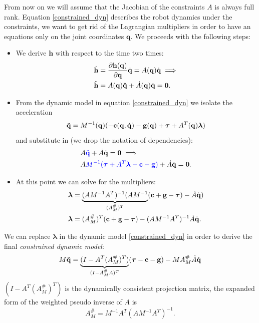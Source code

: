 \documentclass[10pt, a4paper]{report}
\newcommand{\q}{{\mathbf q}}
\begin{document}
From now on we will assume that the Jacobian of the constraints $A$ is always full rank. Equation \eqref{constrained_dyn} describes the robot dynamics under the constraints, we want to get rid of the Lagrangian multipliers in order to have an equations only on the joint coordinates $\q$. We proceeds with the following steps:\begin{itemize}
    \item We derive $\mathbf h$ with respect to the time two times:\begin{align}
       & \dot{\mathbf h}=\frac{\partial \mathbf h(\q)}{\partial \q}\dq=A(\q)\dq\implies\\ 
       & \ddot{\mathbf h}=A(\q)\ddq+\dot A(\q)\dq=\mathbf 0.
    \end{align}
    \item From the dynamic model in equation \eqref{constrained_dyn} we isolate the acceleration\begin{equation}
        \ddq=M^{-1}(\q)(-\mathbf c(\q,\dq)-\mathbf g(\q)+\btau+A^T(\q)\boldsymbol{\lambda})
    \end{equation}
    and substitute in (we drop the notation of dependencies):\begin{align}
        &A\color{blue}{\ddot{\mathbf q}}\color{black}+\dot A{\dot{\mathbf q}}=\mathbf 0\implies\\
        &A\color{blue}M^{-1}({\boldsymbol{\tau}}+A^T\boldsymbol{\lambda}-\mathbf c-\mathbf g)\color{black}+\dot A{\dot{\mathbf q}}=\mathbf 0.
    \end{align}
    \item At this point we can solve for the multipliers:\begin{align}
        &\boldsymbol{\lambda}=\underbrace{(AM^{-1}A^T)^{-1}(AM^{-1}}_{(A_M^\#)^{T}}(\mathbf c+\mathbf g-{\boldsymbol{\tau}})-\dot A{\dot{\mathbf q}})\\ 
        &\boldsymbol{\lambda}=(A_M^\#)^{T}(\mathbf c+\mathbf g-{\boldsymbol{\tau}})-(AM^{-1}A^T)^{-1}\dot A{\dot{\mathbf q}}.
    \end{align}
\end{itemize}
We can replace $\boldsymbol{\lambda}$ in the dynamic model \eqref{constrained_dyn} in order to derive the final \textit{constrained dynamic model}:\begin{equation}\label{dyn_model_constr}
    M{\ddot{\mathbf q}}=\underbrace{(I-A^T(A_M^\#)^T)}_{(I-A_M^\#A)^T}({\boldsymbol{\tau}}-\mathbf c-\mathbf g)-MA_M^\#\dot A{\dot{\mathbf q}}
\end{equation}
$(I-A^T(A_M^\#)^T)$ is the dynamically consistent projection matrix, the expanded form of the weighted pseudo inverse of $A$ is\begin{equation}
    A_M^\#=M^{-1}A^T(AM^{-1}A^T)^{-1}.
\end{equation}
\end{document}
